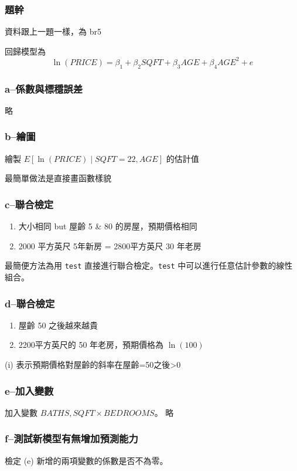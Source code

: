 \begin{frame}
    \frametitle{題幹}

    資料跟上一題一樣，為 br5

    回歸模型為
    \begin{equation}
    \ln(PRICE)=\beta_1 + \beta_2 SQFT + \beta_3 AGE + \beta_4 AGE^2 + e
    \end{equation}
\end{frame}

\begin{frame}
    \frametitle{a--係數與標穩誤差}
    略
\end{frame}

\begin{frame}
    \frametitle{b--繪圖}
    繪製 $E[\ln(PRICE) \mid SQFT = 22, AGE]$ 的估計值

    \vfill

    最簡單做法是直接畫函數樣貌

\end{frame}

\begin{frame}
    \frametitle{c--聯合檢定}

    \begin{enumerate}
        \item 大小相同 but 屋齡 5 \& 80 的房屋，預期價格相同
        \item 2000 平方英尺 5年新房 = 2800平方英尺 30 年老房
    \end{enumerate}
    
    \vfill

    最簡便方法為用 \texttt{test} 直接進行聯合檢定。\texttt{test} 中可以進行任意估計參數的線性組合。 

\end{frame}

\begin{frame}
    \frametitle{d--聯合檢定}
    \begin{enumerate}
        \item 屋齡 50 之後越來越貴
        \item 2200平方英尺的 50 年老房，預期價格為 $\ln(100)$ 
    \end{enumerate}

    \vfill
    (i) 表示預期價格對屋齡的斜率在屋齡=50之後>0
\end{frame}

\begin{frame}
    \frametitle{e--加入變數}
    加入變數 $BATHS, SQFT \times BEDROOMS$。
    \vfill
    略
\end{frame}

\begin{frame}
    \frametitle{f--測試新模型有無增加預測能力}

    檢定 (e) 新增的兩項變數的係數是否不為零。
    

\end{frame}